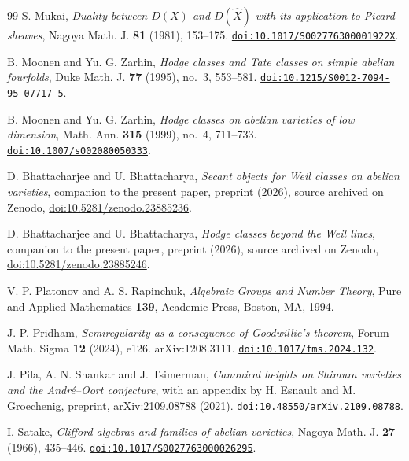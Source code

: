 \documentclass[11pt,reqno]{amsart}
\theoremstyle{plain}
\theoremstyle{definition}
\theoremstyle{remark}
\begin{document}
\begin{thebibliography}{99}
S. Mukai,
\emph{Duality between $D(X)$ and $D(\hat{X})$ with its application to Picard
sheaves},
Nagoya Math. J. \textbf{81} (1981), 153--175.
\href{https://doi.org/10.1017/S002776300001922X}{\texttt{doi:10.1017/S002776300001922X}}.

B. Moonen and Yu. G. Zarhin,
\emph{Hodge classes and Tate classes on simple abelian fourfolds},
Duke Math. J. \textbf{77} (1995), no.~3, 553--581.
\href{https://doi.org/10.1215/S0012-7094-95-07717-5}{\texttt{doi:10.1215/S0012-7094-95-07717-5}}.

B. Moonen and Yu. G. Zarhin,
\emph{Hodge classes on abelian varieties of low dimension},
Math. Ann. \textbf{315} (1999), no.~4, 711--733.
\href{https://doi.org/10.1007/s002080050333}{\texttt{doi:10.1007/s002080050333}}.

D. Bhattacharjee and U. Bhattacharya,
\emph{Secant objects for Weil classes on abelian varieties},
companion to the present paper, preprint (2026), source archived on Zenodo,
\href{https://doi.org/10.5281/zenodo.23885236}{doi:10.5281/zenodo.23885236}.

D. Bhattacharjee and U. Bhattacharya,
\emph{Hodge classes beyond the Weil lines},
companion to the present paper, preprint (2026), source archived on Zenodo,
\href{https://doi.org/10.5281/zenodo.23885246}{doi:10.5281/zenodo.23885246}.

V. P. Platonov and A. S. Rapinchuk,
\emph{Algebraic Groups and Number Theory},
Pure and Applied Mathematics \textbf{139},
Academic Press, Boston, MA, 1994.

J. P. Pridham,
\emph{Semiregularity as a consequence of Goodwillie's theorem},
Forum Math. Sigma \textbf{12} (2024), e126. arXiv:1208.3111.
\href{https://doi.org/10.1017/fms.2024.132}{\texttt{doi:10.1017/fms.2024.132}}.

J. Pila, A. N. Shankar and J. Tsimerman,
\emph{Canonical heights on Shimura varieties and the Andr\'e--Oort
conjecture}, with an appendix by H. Esnault and M. Groechenig,
preprint, arXiv:2109.08788 (2021).
\href{https://doi.org/10.48550/arXiv.2109.08788}{\texttt{doi:10.48550/arXiv.2109.08788}}.

I. Satake,
\emph{Clifford algebras and families of abelian varieties},
Nagoya Math. J. \textbf{27} (1966), 435--446.
\href{https://doi.org/10.1017/S0027763000026295}{\texttt{doi:10.1017/S0027763000026295}}.


\end{thebibliography}
\end{document}
